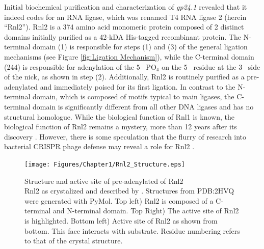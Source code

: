     Initial biochemical purification and characterization of \textit{gp24.1} \citep{Ho2002b} revealed that it indeed codes for an RNA ligase, which was renamed T4 RNA ligase 2 (herein ``Rnl2''). Rnl2 is a 374 amino acid monomeric protein composed of 2 distinct domains initially purified as a 42-kDA His-tagged recombinant protein. The N-terminal domain (1) is responsible for steps (1) and (3) of the general ligation mechanisms (see Figure \ref{fig:Ligation Mechanism}), while the C-terminal domain (244) is responsible for adenylation of the 5\textprime~ PO$_{4}$ on the 5\textprime~ residue at the 3\textprime~ side of the nick, as shown in step (2). Additionally, Rnl2 is routinely purified as a pre-adenylated and immediately poised for its first ligation. In contrast to the N-terminal domain, which is composed of motifs typical to main ligases, the C-terminal domain is significantly  different from all other DNA ligases and has no structural homologue. While the biological function of Rnl1 is known, the biological function of Rnl2 remains a mystery, more than 12 years after its discovery \citep{Chauleau2013b}. However, there is some speculation that the flurry of research into bacterial CRISPR phage defense may reveal a role for Rnl2 \citep{Barrangou2007c,Chauleau2013b}.

    \begin{figure}[htbp] %
      \centering 
      \texttt{[image: Figures/Chapter1/Rnl2\_Structure.eps]}
      \caption[Structure and active site of pre-adenylated of Rnl2]
      {
        Structure and active site of pre-adenylated of Rnl2\\[0.25cm]
        Rnl2 as crystalized and described by \citep{Nandakumar2006}. Structures from PDB:2HVQ were generated with PyMol. Top left) Rnl2 is composed of a C-terminal and N-terminal domain. Top Right) The active site of Rnl2 is highlighted. Bottom left) Active site of Rnl2 as shown from bottom. This face interacts with substrate. Residue numbering refers to that of the crystal structure.
        }
      \label{fig:Rnl2 General Structure}
      \end{figure}

